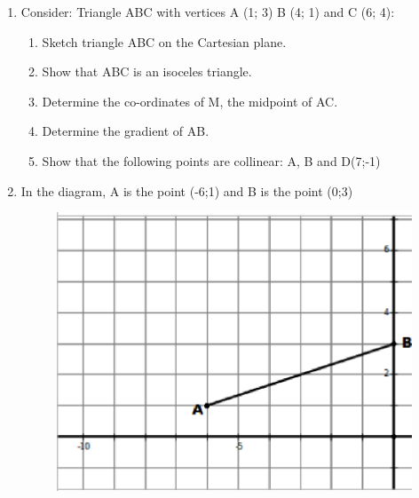 \begin{enumerate}[noitemsep, label=\textbf{\arabic*}. ]
\item 
Consider: Triangle ABC with vertices A (1; 3) B (4; 1) and C (6; 4):
\label{m39358*id9173123}\begin{enumerate}[noitemsep, label=\textbf{\alph*}. ] 
            \item Sketch triangle ABC on the Cartesian plane. \item Show that ABC is an isoceles triangle.\item Determine the co-ordinates of M, the midpoint of AC.\item Determine the gradient of AB.\item Show that the following points are collinear: A, B and D(7;-1)\end{enumerate}
                
\item In the diagram, A is the point (-6;1) and B is the point (0;3)

    \setcounter{subfigure}{0}


	\begin{figure}[H] %
    \begin{center}
    \label{m39358*id740344!!!underscore!!!media}\label{m39358*id740344!!!underscore!!!printimage}\includegraphics[width=.7\columnwidth]{col11306.imgs/m39358_MG10C14_5.png} %
        
      \vspace{2pt}
    \vspace{.1in}
    
    \end{center}

 \end{figure}   


\end{enumerate}
